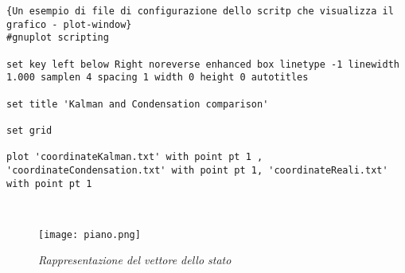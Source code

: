 \lstset{language=bash}
\lstset{commentstyle=\emph}
\begin{lstlisting}[frame=r,caption=Un esempio di file di configurazione dello scritp che visualizza il grafico - plot-window ,breaklines=true,basicstyle=\scriptsize]{Un esempio di file di configurazione dello scritp che visualizza il grafico - plot-window}
#gnuplot scripting

set key left below Right noreverse enhanced box linetype -1 linewidth 1.000 samplen 4 spacing 1 width 0 height 0 autotitles

set title 'Kalman and Condensation comparison'

set grid

plot 'coordinateKalman.txt' with point pt 1 , 'coordinateCondensation.txt' with point pt 1, 'coordinateReali.txt' with point pt 1



\end{lstlisting}

\begin{figure}[b]
\centering
	\texttt{[image: piano.png]}
\caption[Rappresentazione del vettore dello stato]{\textit{Rappresentazione del vettore dello stato}\label{fig:pianoStato}}
\end{figure}
